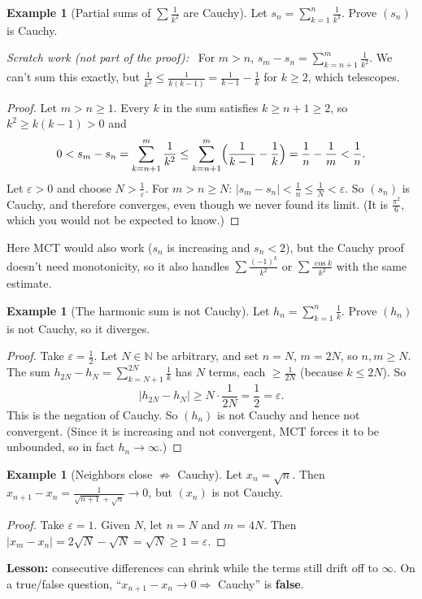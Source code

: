 \documentclass[11pt]{article}
\theoremstyle{definition}
\newtheorem{ex}[defn]{Example}
\newcommand{\N}{\mathbb{N}}
\newcommand{\eps}{\varepsilon}
\newcommand{\key}[1]{\textcolor{red!70!black}{\textbf{#1}}}
\newenvironment{scratch}{\par\medskip\noindent\textit{Scratch work (not part of the proof):}\ }{\par\medskip}
\begin{document}
\begin{ex}[Partial sums of $\sum\frac1{k^2}$ are Cauchy]\label{ex:sumsq}
Let $s_n=\sum_{k=1}^n\frac1{k^2}$. Prove $(s_n)$ is Cauchy.

\begin{scratch}
For $m>n$, $s_m-s_n=\sum_{k=n+1}^m\frac1{k^2}$. We can't sum this exactly,
but $\frac1{k^2}\le\frac1{k(k-1)}=\frac1{k-1}-\frac1k$ for $k\ge2$, which
telescopes.
\end{scratch}

\begin{proof}
Let $m>n\ge1$. Every $k$ in the sum satisfies $k\ge n+1\ge2$, so
$k^2\ge k(k-1)>0$ and
\[
0<s_m-s_n=\sum_{k=n+1}^m\frac1{k^2}\le\sum_{k=n+1}^m\Bigl(\frac1{k-1}-\frac1k\Bigr)
=\frac1n-\frac1m<\frac1n.
\]
Let $\eps>0$ and choose $N>\frac1\eps$. For $m>n\ge N$:
$|s_m-s_n|<\frac1n\le\frac1N<\eps$. So $(s_n)$ is Cauchy, and therefore
converges, even though we never found its limit. (It is
$\frac{\pi^2}{6}$, which you would not be expected to know.)
\end{proof}
\noindent Here MCT would also work ($s_n$ is increasing and $s_n<2$), but
the Cauchy proof doesn't need monotonicity, so it also handles
$\sum\frac{(-1)^k}{k^2}$ or $\sum\frac{\cos k}{k^2}$ with the same estimate.
\end{ex}

\begin{ex}[The harmonic sum is not Cauchy]\label{ex:harm}
Let $h_n=\sum_{k=1}^n\frac1k$. Prove $(h_n)$ is not Cauchy, so it diverges.

\begin{proof}
Take $\eps=\frac12$. Let $N\in\N$ be arbitrary, and set $n=N$, $m=2N$, so
$n,m\ge N$. The sum $h_{2N}-h_N=\sum_{k=N+1}^{2N}\frac1k$ has $N$ terms,
each $\ge\frac1{2N}$ (because $k\le2N$). So
\[
|h_{2N}-h_N|\ge N\cdot\frac1{2N}=\frac12=\eps.
\]
This is the negation of Cauchy. So $(h_n)$ is not Cauchy and hence not
convergent. (Since it is increasing and not convergent, MCT forces it to
be unbounded, so in fact $h_n\to\infty$.)
\end{proof}
\end{ex}

\begin{ex}[Neighbors close $\not\Rightarrow$ Cauchy]\label{ex:sqrtn}
Let $x_n=\sqrt n$. Then
$x_{n+1}-x_n=\frac1{\sqrt{n+1}+\sqrt n}\to0$, but $(x_n)$ is not Cauchy.

\begin{proof}
Take $\eps=1$. Given $N$, let $n=N$ and $m=4N$. Then
$|x_m-x_n|=2\sqrt N-\sqrt N=\sqrt N\ge1=\eps$.
\end{proof}
\noindent \key{Lesson:} consecutive differences can shrink while the
terms still drift off to $\infty$. On a true/false question,
``$x_{n+1}-x_n\to0\Rightarrow$ Cauchy'' is \textbf{false}.
\end{ex}
\end{document}
